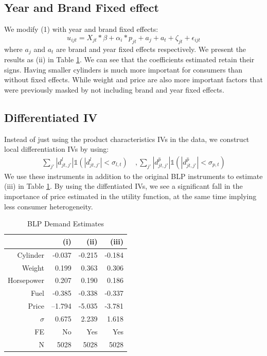 \documentclass[a4paper,12pt]{article}
\begin{document}
\subsection{Year and Brand Fixed effect}

We modify (1) with year and brand fixed effects:
\begin{equation}
    u_{ijt} = X_{jt}*\beta + \alpha_{i} * p_{jt} + a_j + a_t + \zeta_{jt} + \epsilon_{ijt}
\end{equation}
where $a_j$ and $a_t$ are brand and year fixed effects respectively. We present the results as (ii) in Table \ref{m1}. We can see that the coefficients estimated retain their signs. Having smaller cylinders is much more important for consumers than without fixed effects. While weight and price are also more important factors that were previously masked by not including brand and year fixed effects. 

\subsection{Differentiated IV}
Instead of just using the product characteristics IVs in the data, we construct local differentiation IVs by using:
\begin{align*}
    \sum_{j'} |d^l_{jt,j'}| \mathds{1}(|d^l_{jt,j'}| < \sigma_{l,t}) \quad , \sum_{j'} |d^{\hat{p}}_{jt,j'}|\mathds{1}(|d^{\hat{p}}_{jt,j'}|<\sigma_{p,t})
\end{align*}
We use these instruments in addition to the original BLP instruments to estimate (iii) in Table \ref{m1}. By using the diffentiated IVs, we see a significant fall in the importance of price estimated in the utility function, at the same time implying less consumer heterogeneity.

\begin{table}[h!]
    \centering
    \caption{BLP Demand Estimates}
    \begin{tabular}{rrrr} 
    \hline\hline
                              & (i)     & (ii)   & (iii)  \\ 
    \hline
    Cylinder                  & -0.037  & -0.215 & -0.184 \\
    Weight                    & 0.199   & 0.363  & 0.306 \\
    Horsepower                & 0.207   & 0.190  & 0.186  \\
    Fuel                      & -0.385  & -0.338 & -0.337  \\
    Price                     & --1.794 & -5.035 & -3.781\\
    $\sigma$ & 0.675   & 2.239  &    1.618    \\ 
    \hline
    FE                        & No      & Yes    & Yes    \\
    N                         & 5028    & 5028   & 5028   \\
    \hline\hline
    \end{tabular}
    \label{m1}
\end{table}
\end{document}
